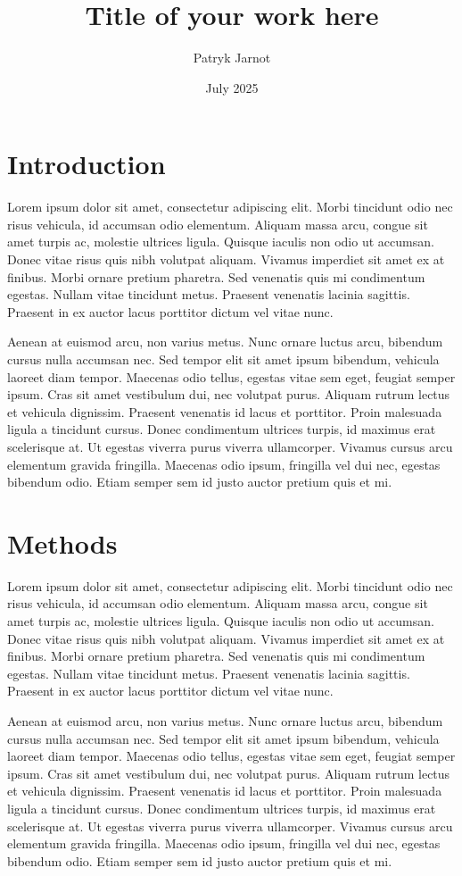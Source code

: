\documentclass[onecolumn]{miniclass}
\title{Title of your work here}
\author[1,$\ast$]{Patryk Jarnot}
\affil[1]{Department of Computer Network and Systems, Silesian University of Technology}
\affil[$\ast$]{patryk.jarnot@polsl.pl}
\date{July 2025}
\begin{document}
\maketitle

\section{Introduction}
Lorem ipsum dolor sit amet, consectetur adipiscing elit. Morbi tincidunt odio nec risus vehicula, id accumsan odio elementum. Aliquam massa arcu, congue sit amet turpis ac, molestie ultrices ligula. Quisque iaculis non odio ut accumsan. Donec vitae risus quis nibh volutpat aliquam. Vivamus imperdiet sit amet ex at finibus. Morbi ornare pretium pharetra. Sed venenatis quis mi condimentum egestas. Nullam vitae tincidunt metus. Praesent venenatis lacinia sagittis. Praesent in ex auctor lacus porttitor dictum vel vitae nunc.

Aenean at euismod arcu, non varius metus. Nunc ornare luctus arcu, bibendum cursus nulla accumsan nec. Sed tempor elit sit amet ipsum bibendum, vehicula laoreet diam tempor. Maecenas odio tellus, egestas vitae sem eget, feugiat semper ipsum. Cras sit amet vestibulum dui, nec volutpat purus. Aliquam rutrum lectus et vehicula dignissim. Praesent venenatis id lacus et porttitor. Proin malesuada ligula a tincidunt cursus. Donec condimentum ultrices turpis, id maximus erat scelerisque at. Ut egestas viverra purus viverra ullamcorper. Vivamus cursus arcu elementum gravida fringilla. Maecenas odio ipsum, fringilla vel dui nec, egestas bibendum odio. Etiam semper sem id justo auctor pretium quis et mi.

\section{Methods}
Lorem ipsum dolor sit amet, consectetur adipiscing elit. Morbi tincidunt odio nec risus vehicula, id accumsan odio elementum. Aliquam massa arcu, congue sit amet turpis ac, molestie ultrices ligula. Quisque iaculis non odio ut accumsan. Donec vitae risus quis nibh volutpat aliquam. Vivamus imperdiet sit amet ex at finibus. Morbi ornare pretium pharetra. Sed venenatis quis mi condimentum egestas. Nullam vitae tincidunt metus. Praesent venenatis lacinia sagittis. Praesent in ex auctor lacus porttitor dictum vel vitae nunc.

Aenean at euismod arcu, non varius metus. Nunc ornare luctus arcu, bibendum cursus nulla accumsan nec. Sed tempor elit sit amet ipsum bibendum, vehicula laoreet diam tempor. Maecenas odio tellus, egestas vitae sem eget, feugiat semper ipsum. Cras sit amet vestibulum dui, nec volutpat purus. Aliquam rutrum lectus et vehicula dignissim. Praesent venenatis id lacus et porttitor. Proin malesuada ligula a tincidunt cursus. Donec condimentum ultrices turpis, id maximus erat scelerisque at. Ut egestas viverra purus viverra ullamcorper. Vivamus cursus arcu elementum gravida fringilla. Maecenas odio ipsum, fringilla vel dui nec, egestas bibendum odio. Etiam semper sem id justo auctor pretium quis et mi.
\end{document}
